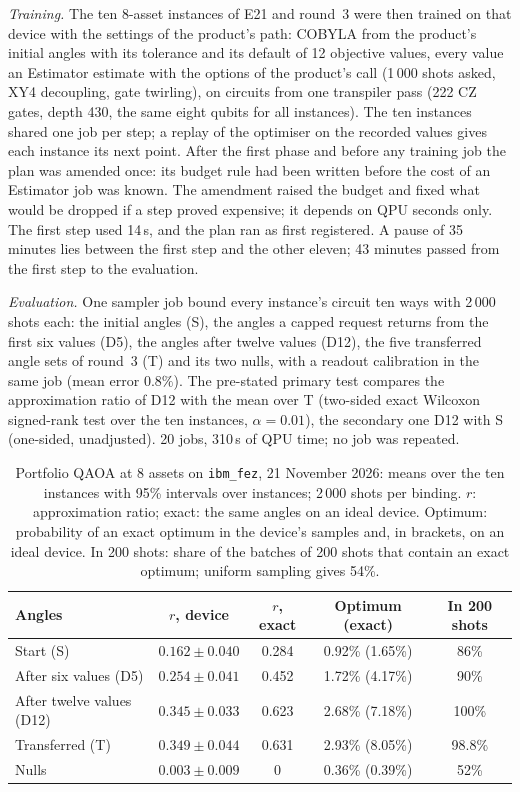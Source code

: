 \documentclass[11pt,a4paper]{article}
\begin{document}
\emph{Training.} The ten 8-asset instances of E21 and round~3 were then
trained on that device with the settings of the product's path: COBYLA from
the product's initial angles with its tolerance and its default of 12
objective values, every value an Estimator estimate with the options of
the product's call (1\,000 shots asked, XY4 decoupling, gate twirling), on circuits from one transpiler pass (222
CZ gates, depth 430, the same eight qubits for all instances). The ten
instances shared one job per step; a replay of the optimiser on the
recorded values gives each instance its next point. After the first phase
and before any training job the plan was amended once: its budget rule had
been written before the cost of an Estimator job was known. The amendment
raised the budget and fixed what would be dropped if a step proved
expensive; it depends on QPU seconds only. The first step used 14\,s, and
the plan ran as first registered. A pause of 35 minutes lies between the
first step and the other eleven; 43 minutes passed from the first step to
the evaluation.

\emph{Evaluation.} One sampler job bound every instance's circuit ten ways
with 2\,000 shots each: the initial angles (S), the angles a capped request
returns from the first six values (D5), the angles after twelve values
(D12), the five transferred angle sets of round~3 (T) and its two nulls,
with a readout calibration in the same job (mean error $0.8\%$). The
pre-stated primary test compares the approximation ratio of D12 with the
mean over T (two-sided exact Wilcoxon signed-rank test over the ten
instances, $\alpha = 0.01$), the secondary one D12 with S (one-sided,
unadjusted). 20 jobs, 310\,s of QPU time; no job was repeated.

\begin{table}[H]
\centering\footnotesize\setlength{\tabcolsep}{5pt}
\begin{tabular}{lcccc}
\toprule
Angles & $r$, device & $r$, exact & Optimum (exact) & In 200 shots \\
\midrule
Start (S) & $0.162 \pm 0.040$ & 0.284 & 0.92\% (1.65\%) & 86\% \\
After six values (D5) & $0.254 \pm 0.041$ & 0.452 & 1.72\% (4.17\%) & 90\% \\
After twelve values (D12) & $0.345 \pm 0.033$ & 0.623 & 2.68\% (7.18\%) & 100\% \\
Transferred (T) & $0.349 \pm 0.044$ & 0.631 & 2.93\% (8.05\%) & 98.8\% \\
Nulls & $0.003 \pm 0.009$ & 0 & 0.36\% (0.39\%) & 52\% \\
\bottomrule
\end{tabular}
\caption{Portfolio QAOA at 8 assets on \texttt{ibm\_fez}, 21 November 2026:
means over the ten instances with 95\% intervals over instances; 2\,000
shots per binding. $r$: approximation ratio; exact: the same angles on an
ideal device. Optimum: probability of an exact optimum in the device's
samples and, in brackets, on an ideal device. In 200 shots:
share of the batches of 200 shots that contain an exact optimum; uniform
sampling gives 54\%.}
\label{tab:hw-train}
\end{table}
\end{document}
